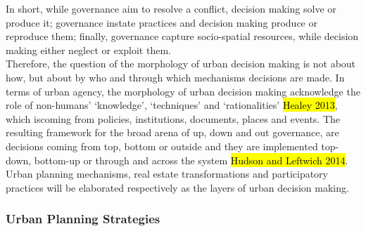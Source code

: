 \documentclass[11pt]{report}
\begin{document}
In short, while governance aim to resolve a conflict, decision making solve or produce it; governance instate practices and decision making produce or reproduce them; finally, governance capture socio-spatial resources, while decision making either neglect or exploit them.
\\
Therefore, the question of the morphology of urban decision making is not about how, but about by who and through which mechanisms decisions are made.
In terms of urban agency, the morphology of urban decision making acknowledge the role of non-humans' ‘knowledge’, ‘techniques’ and ‘rationalities’ \hl{Healey 2013}, which iscoming from policies, institutions, documents, places and events.
The resulting framework for the broad arena of up, down and out governance, are decisions coming from top, bottom or outside and they are implemented top-down, bottom-up or through and across the system
\hl{Hudson and Leftwich 2014}.
Urban planning mechanisms, real estate transformations and participatory practices will be elaborated respectively as the layers of urban decision making.

\subsubsection{Urban Planning Strategies}
\end{document}
